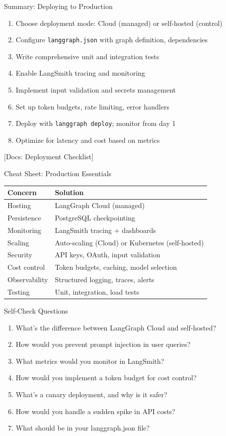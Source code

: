 \documentclass[aspectratio=169,11pt]{beamer}
\newcommand{\docref}[1]{{\scriptsize\color{docgray}[Docs: #1]}}
\begin{document}
\begin{frame}{Summary: Deploying to Production}
\setlength{\itemsep}{1pt}
\begin{enumerate}
\item Choose deployment mode: Cloud (managed) or self-hosted (control)
\item Configure \texttt{langgraph.json} with graph definition, dependencies
\item Write comprehensive unit and integration tests
\item Enable LangSmith tracing and monitoring
\item Implement input validation and secrets management
\item Set up token budgets, rate limiting, error handlers
\item Deploy with \texttt{langgraph deploy}; monitor from day 1
\item Optimize for latency and cost based on metrics
\end{enumerate}
\vspace{0.15cm}
\docref{Deployment Checklist}
\end{frame}

\begin{frame}{Cheat Sheet: Production Essentials}
\small
\begin{tabular}{ll}
\toprule
\textbf{Concern} & \textbf{Solution} \\
\midrule
Hosting & LangGraph Cloud (managed) \\
Persistence & PostgreSQL checkpointing \\
Monitoring & LangSmith tracing + dashboards \\
Scaling & Auto-scaling (Cloud) or Kubernetes (self-hosted) \\
Security & API keys, OAuth, input validation \\
Cost control & Token budgets, caching, model selection \\
Observability & Structured logging, traces, alerts \\
Testing & Unit, integration, load tests \\
\bottomrule
\end{tabular}
\end{frame}

\begin{frame}{Self-Check Questions}
\setlength{\itemsep}{2pt}
\begin{enumerate}
\item What's the difference between LangGraph Cloud and self-hosted?
\item How would you prevent prompt injection in user queries?
\item What metrics would you monitor in LangSmith?
\item How would you implement a token budget for cost control?
\item What's a canary deployment, and why is it safer?
\item How would you handle a sudden spike in API costs?
\item What should be in your langgraph.json file?
\end{enumerate}
\end{frame}
\end{document}
